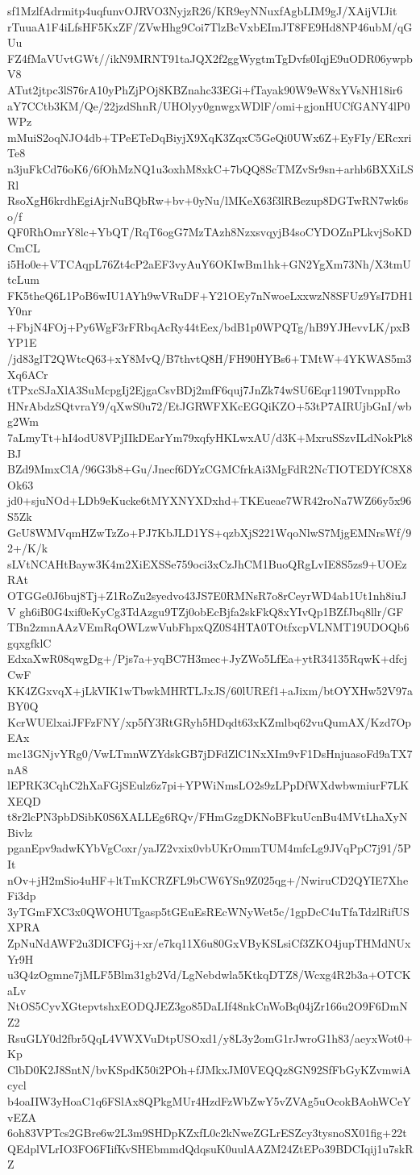 sf1MzlfAdrmitp4uqfunvOJRVO3NyjzR26/KR9eyNNuxfAgbLIM9gJ/XAijVIJit
rTuuaA1F4iLfsHF5KxZF/ZVwHhg9Coi7TlzBcVxbEImJT8FE9Hd8NP46ubM/qGUu
FZ4fMaVUvtGWt//ikN9MRNT91taJQX2f2ggWygtmTgDvfs0IqjE9uODR06ywpbV8
ATut2jtpc3lS76rA10yPhZjPOj8KBZnahc33EGi+fTayak90W9eW8xYVsNH18ir6
aY7CCtb3KM/Qe/22jzdShnR/UHOlyy0gnwgxWDlF/omi+gjonHUCfGANY4lP0WPz
mMuiS2oqNJO4db+TPeETeDqBiyjX9XqK3ZqxC5GeQi0UWx6Z+EyFIy/ERcxriTe8
n3juFkCd76oK6/6fOhMzNQ1u3oxhM8xkC+7bQQ8ScTMZvSr9sn+arhb6BXXiLSRl
RsoXgH6krdhEgiAjrNuBQbRw+bv+0yNu/lMKeX63f3lRBezup8DGTwRN7wk6so/f
QF0RhOmrY8lc+YbQT/RqT6ogG7MzTAzh8NzxsvqyjB4soCYDOZnPLkvjSoKDCmCL
i5Ho0e+VTCAqpL76Zt4cP2aEF3vyAuY6OKIwBm1hk+GN2YgXm73Nh/X3tmUtcLum
FK5theQ6L1PoB6wIU1AYh9wVRuDF+Y21OEy7nNwoeLxxwzN8SFUz9YsI7DH1Y0nr
+FbjN4FOj+Py6WgF3rFRbqAcRy44tEex/bdB1p0WPQTg/hB9YJHevvLK/pxBYP1E
/jd83glT2QWtcQ63+xY8MvQ/B7thvtQ8H/FH90HYBs6+TMtW+4YKWAS5m3Xq6ACr
tTPxcSJaXlA3SuMcpgIj2EjgaCsvBDj2mfF6quj7JnZk74wSU6Eqr1190TvnppRo
HNrAbdzSQtvraY9/qXwS0u72/EtJGRWFXKcEGQiKZO+53tP7AIRUjbGnI/wbg2Wm
7aLmyTt+hI4odU8VPjIIkDEarYm79xqfyHKLwxAU/d3K+MxruSSzvILdNokPk8BJ
BZd9MmxClA/96G3b8+Gu/Jnecf6DYzCGMCfrkAi3MgFdR2NcTIOTEDYfC8X8Ok63
jd0+sjuNOd+LDb9eKucke6tMYXNYXDxhd+TKEueae7WR42roNa7WZ66y5x96S5Zk
GcU8WMVqmHZwTzZo+PJ7KbJLD1YS+qzbXjS221WqoNlwS7MjgEMNrsWf/92+/K/k
sLVtNCAHtBayw3K4m2XiEXSSe759oci3xCzJhCM1BuoQRgLvIE8S5zs9+UOEzRAt
OTGGe0J6buj8Tj+Z1RoZu2syedvo43JS7E0RMNsR7o8rCeyrWD4ab1Ut1nh8iuJV
gh6iB0G4xif0eKyCg3TdAzgu9TZj0obEcBjfa2skFkQ8xYIvQp1BZfJbq8llr/GF
TBn2zmnAAzVEmRqOWLzwVubFhpxQZ0S4HTA0TOtfxcpVLNMT19UDOQb6gqxgfklC
EdxaXwR08qwgDg+/Pjs7a+yqBC7H3mec+JyZWo5LfEa+ytR34135RqwK+dfcjCwF
KK4ZGxvqX+jLkVIK1wTbwkMHRTLJxJS/60lUREf1+aJixm/btOYXHw52V97aBY0Q
KcrWUElxaiJFFzFNY/xp5fY3RtGRyh5HDqdt63xKZmlbq62vuQumAX/Kzd7OpEAx
mc13GNjvYRg0/VwLTmnWZYdskGB7jDFdZlC1NxXIm9vF1DsHnjuasoFd9aTX7nA8
lEPRK3CqhC2hXaFGjSEulz6z7pi+YPWiNmsLO2s9zLPpDfWXdwbwmiurF7LKXEQD
t8r2lcPN3pbDSibK0S6XALLEg6RQv/FHmGzgDKNoBFkuUcnBu4MVtLhaXyNBivlz
pganEpv9adwKYbVgCoxr/yaJZ2vxix0vbUKrOmmTUM4mfcLg9JVqPpC7j91/5PIt
nOv+jH2mSio4uHF+ltTmKCRZFL9bCW6YSn9Z025qg+/NwiruCD2QYIE7XheFi3dp
3yTGmFXC3x0QWOHUTgasp5tGEuEsREcWNyWet5c/1gpDcC4uTfaTdzlRifUSXPRA
ZpNuNdAWF2u3DICFGj+xr/e7kq11X6u80GxVByKSLsiCf3ZKO4jupTHMdNUxYr9H
u3Q4zOgmne7jMLF5Blm31gb2Vd/LgNebdwla5KtkqDTZ8/Wcxg4R2b3a+OTCKaLv
NtOS5CyvXGtepvtshxEODQJEZ3go85DaLIf48nkCnWoBq04jZr166u2O9F6DmNZ2
RsuGLY0d2fbr5QqL4VWXVuDtpUSOxd1/y8L3y2omG1rJwroG1h83/aeyxWot0+Kp
ClbD0K2J8SntN/bvKSpdK50i2POh+fJMkxJM0VEQQz8GN92SfFbGyKZvmwiAcycl
b4oaIIW3yHoaC1q6FSlAx8QPkgMUr4HzdFzWbZwY5vZVAg5uOcokBAohWCeYvEZA
6oh83VPTcs2GBre6w2L3m9SHDpKZxfL0c2kNweZGLrESZcy3tysnoSX01fig+22t
QEdplVLrIO3FO6FIifKvSHEbmmdQdqsuK0uulAAZM24ZtEPo39BDCIqij1u7skRZ
